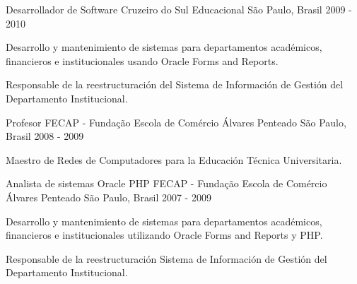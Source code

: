 \begin{cventries}
  \cventry
    {Desarrollador de Software} %
    {Cruzeiro do Sul Educacional} %
    {São Paulo, Brasil} %
    {2009 - 2010} %
    {
      \begin{cvitems} %
        \item {Desarrollo y mantenimiento de sistemas para departamentos académicos, financieros e institucionales usando Oracle Forms and Reports.}
        \item {Responsable de la reestructuración del Sistema de Información de Gestión del Departamento Institucional.}
      \end{cvitems}
    }

  \cventry
    {Profesor} %
    {FECAP - Fundação Escola de Comércio Álvares Penteado} %
    {São Paulo, Brasil} %
    {2008 - 2009} %
    {
      \begin{cvitems} %
        \item {Maestro de Redes de Computadores para la Educación Técnica Universitaria.}
      \end{cvitems}
    }

  \cventry
    {Analista de sistemas Oracle PHP} %
    {FECAP - Fundação Escola de Comércio Álvares Penteado} %
    {São Paulo, Brasil} %
    {2007 - 2009} %
    {
      \begin{cvitems} %
        \item {Desarrollo y mantenimiento de sistemas para departamentos académicos, financieros e institucionales utilizando Oracle Forms and Reports y PHP.}
       \item{Responsable de la reestructuración Sistema de Información de Gestión del Departamento Institucional.}
      \end{cvitems}
    }


\end{cventries}
